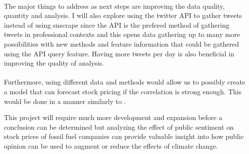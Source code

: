 \documentclass[12pt, letterpaper, titlepage]{article}
\begin{document}
\paragraph{}
The major things to address as next steps are improving the data quality, quantity and analysis. I will also explore using the twitter API to gather tweets instead of using snscrape since the API is the prefered method of gathering tweets in professional contexts and this opens data gathering up to many more possibilities with new methods and feature information that could be gathered using the API query feature.  Having more tweets per day is also beneficial in improving the quality of analysis. 

\paragraph{}
Furthermore, using different data and methods would allow us to possibly create a model that can forecast stock pricing if the correlation is strong enough. This would be done in a manner similarly to \citep{zhao2019forecasting}. 

This project will require much more development and expansion before a conclusion  can be determined but analyzing the effect of public sentiment on stock prices of fossil fuel companies can provide valuable insight into how public opinion can be used to augment or reduce the effects of climate change.
\bigskip
\bigskip
\bigskip
\bigskip
\bigskip
\bigskip
\bigskip
\bigskip
\bigskip
\bigskip
\bigskip
\bigskip
\bigskip
\bigskip
\bigskip
\bigskip
\bigskip
\bigskip
\bigskip
\bigskip
\bigskip
\bigskip
\bigskip
\bigskip


\end{document}
